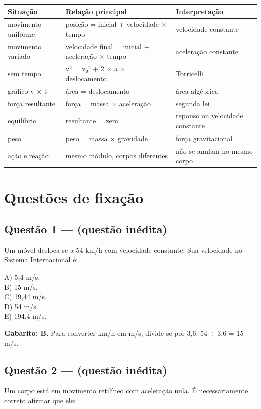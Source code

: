 \documentclass[11pt,a4paper]{article}
\begin{document}
\begin{tabularx}{\linewidth}{llX}
\toprule
 \textbf{Situação} & \textbf{Relação principal} & \textbf{Interpretação} \\
\midrule
 movimento uniforme & posição = inicial + velocidade × tempo & velocidade constante \\
 movimento variado & velocidade final = inicial + aceleração × tempo & aceleração constante \\
 sem tempo & v² = v₀² + 2 × a × deslocamento & Torricelli \\
 gráfico v × t & área = deslocamento & área algébrica \\
 força resultante & força = massa × aceleração & segunda lei \\
 equilíbrio & resultante = zero & repouso ou velocidade constante \\
 peso & peso = massa × gravidade & força gravitacional \\
 ação e reação & mesmo módulo, corpos diferentes & não se anulam no mesmo corpo \\
\bottomrule
\end{tabularx}


\section*{Questões de fixação}

\subsection*{Questão 1 — (questão inédita)}

Um móvel desloca-se a 54 km/h com velocidade constante. Sua velocidade no Sistema Internacional é:

A) 5,4 m/s. \\ B) 15 m/s. \\ C) 19,44 m/s. \\ D) 54 m/s. \\ E) 194,4 m/s.

\begin{alerta}
\textbf{Gabarito: B.} Para converter km/h em m/s, divide-se por 3,6: 54 ÷ 3,6 = 15 m/s.
\end{alerta}

\subsection*{Questão 2 — (questão inédita)}

Um corpo está em movimento retilíneo com aceleração nula. É necessariamente correto afirmar que ele:
\end{document}
